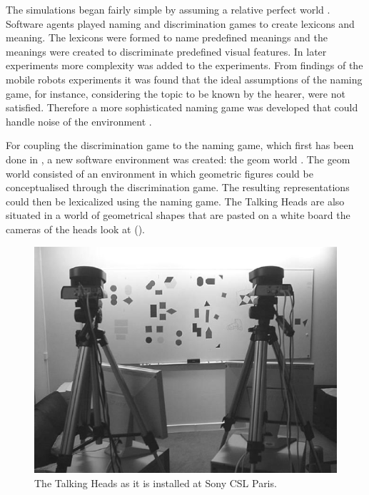 The simulations began fairly simple by assuming a relative perfect world \citep{steels:1996a,steels:1996b}. Software agents played naming and discrimination games to create lexicons and meaning. The lexicons were formed to name predefined meanings and the meanings were created to discriminate predefined visual features. In later experiments more complexity was added to the experiments. From findings of the mobile robots experiments \citep{vogt:1998a} it was found that the ideal assumptions of the naming game, for instance, considering the topic to be known by the hearer, were not satisfied. Therefore a more sophisticated naming game was developed that could handle noise of the environment \citep{steelskaplan:1998}. 

For coupling the discrimination game to the naming game, which first has been done in \citealt{steelsvogt:1997}, a new software environment was created: the {\sc geom} world \citep{steels:2000}. The {\sc geom} world consisted of an environment in which geometric figures could be conceptualised through the discrimination game. The resulting representations could then be lexicalized using the naming game. The Talking Heads are also situated in a world of geometrical shapes that are pasted on a white board the cameras of the heads look at ().

\begin{figure}[t]
\centering
\includegraphics[width=12cm]{theory/th.eps}
\caption{The Talking Heads as it is installed at Sony CSL Paris.}
\label{f:theory:talkingheads}
\end{figure}

